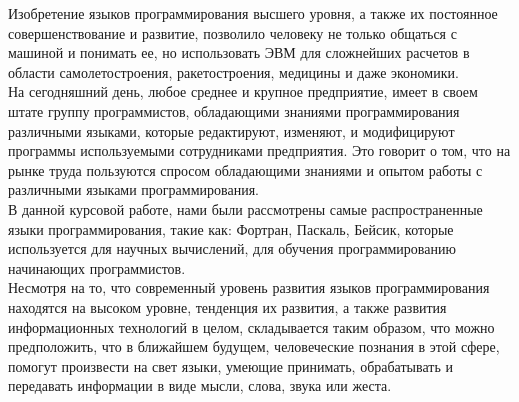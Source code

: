 Изобретение языков программирования высшего уровня, а также их постоянное совершенствование и развитие, позволило человеку не только общаться с машиной и понимать ее, но использовать ЭВМ для сложнейших расчетов в области самолетостроения, ракетостроения, медицины и даже экономики. \\

На сегодняшний день, любое среднее и крупное предприятие, имеет в своем штате группу программистов, обладающими знаниями программирования различными языками, которые редактируют, изменяют, и модифицируют программы используемыми сотрудниками предприятия. Это говорит о том, что на рынке труда пользуются спросом обладающими знаниями и опытом работы с различными языками программирования. \\

В данной курсовой работе, нами были рассмотрены самые распространенные языки программирования, такие как: Фортран, Паскаль, Бейсик, которые используется для научных вычислений, для обучения программированию начинающих программистов. \\

Несмотря на то, что современный уровень развития языков программирования находятся на высоком уровне, тенденция их развития, а также развития информационных технологий в целом, складывается таким образом, что можно предположить, что в ближайшем будущем, человеческие познания в этой сфере, помогут произвести на свет языки, умеющие принимать, обрабатывать и передавать информации в виде мысли, слова, звука или жеста. \\


